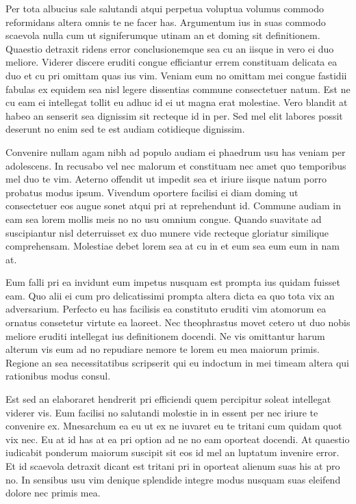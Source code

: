 Per tota albucius sale salutandi atqui perpetua voluptua volumus commodo reformidans altera omnis te ne facer has. Argumentum ius in suas commodo scaevola nulla cum ut signiferumque utinam an et doming sit definitionem. Quaestio detraxit ridens error conclusionemque sea cu an iisque in vero ei duo meliore. Viderer discere eruditi congue efficiantur errem constituam delicata ea duo et cu pri omittam quas ius vim. Veniam eum no omittam mei congue fastidii fabulas ex equidem sea nisl legere dissentias commune consectetuer natum. Est ne cu eam ei intellegat tollit eu adhuc id ei ut magna erat molestiae. Vero blandit at habeo an senserit sea dignissim sit recteque id in per. Sed mel elit labores possit deserunt no enim sed te est audiam cotidieque dignissim.

Convenire nullam agam nibh ad populo audiam ei phaedrum usu has veniam per adolescens. In recusabo vel nec malorum et constituam nec amet quo temporibus mel duo te vim. Aeterno offendit ut impedit sea et iriure iisque natum porro probatus modus ipsum. Vivendum oportere facilisi ei diam doming ut consectetuer eos augue sonet atqui pri at reprehendunt id. Commune audiam in eam sea lorem mollis meis no no usu omnium congue. Quando suavitate ad suscipiantur nisl deterruisset ex duo munere vide recteque gloriatur similique comprehensam. Molestiae debet lorem sea at cu in et eum sea eum eum in nam at.

Eum falli pri ea invidunt eum impetus nusquam est prompta ius quidam fuisset eam. Quo alii ei cum pro delicatissimi prompta altera dicta ea quo tota vix an adversarium. Perfecto eu has facilisis ea constituto eruditi vim atomorum ea ornatus consetetur virtute ea laoreet. Nec theophrastus movet cetero ut duo nobis meliore eruditi intellegat ius definitionem docendi. Ne vis omittantur harum alterum vis eum ad no repudiare nemore te lorem eu mea maiorum primis. Regione an sea necessitatibus scripserit qui eu indoctum in mei timeam altera qui rationibus modus consul.

Est sed an elaboraret hendrerit pri efficiendi quem percipitur soleat intellegat viderer vis. Eum facilisi no salutandi molestie in in essent per nec iriure te convenire ex. Mnesarchum ea eu ut ex ne iuvaret eu te tritani cum quidam quot vix nec. Eu at id has at ea pri option ad ne no eam oporteat docendi. At quaestio iudicabit ponderum maiorum suscipit sit eos id mel an luptatum invenire error. Et id scaevola detraxit dicant est tritani pri in oporteat alienum suas his at pro no. In sensibus usu vim denique splendide integre modus nusquam suas eleifend dolore nec primis mea.

